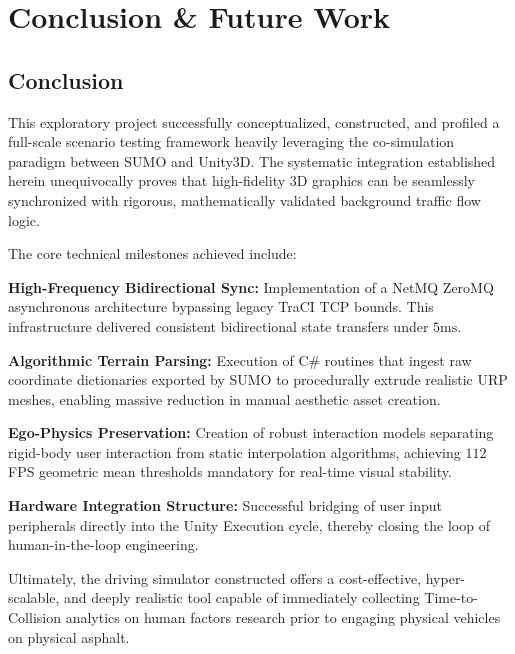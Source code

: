 \chapter{Conclusion \& Future Work}

\section{Conclusion}

This exploratory project successfully conceptualized, constructed, and profiled a full-scale scenario testing framework heavily leveraging the co-simulation paradigm between SUMO and Unity3D. The systematic integration established herein unequivocally proves that high-fidelity 3D graphics can be seamlessly synchronized with rigorous, mathematically validated background traffic flow logic.

The core technical milestones achieved include:
\begin{enumerate}[label={\colorbox{PrimaryNavy}{\makebox[1.2em][c]{\color{white}\bfseries\arabic*}}}, leftmargin=3em, itemsep=8pt]
    \item \textbf{High-Frequency Bidirectional Sync:} Implementation of a NetMQ ZeroMQ asynchronous architecture bypassing legacy TraCI TCP bounds. This infrastructure delivered consistent bidirectional state transfers under $5\text{ms}$.
    \item \textbf{Algorithmic Terrain Parsing:} Execution of C\# routines that ingest raw coordinate dictionaries exported by SUMO to procedurally extrude realistic URP meshes, enabling massive reduction in manual aesthetic asset creation.
    \item \textbf{Ego-Physics Preservation:} Creation of robust interaction models separating rigid-body user interaction from static interpolation algorithms, achieving $112$ FPS geometric mean thresholds mandatory for real-time visual stability.
    \item \textbf{Hardware Integration Structure:} Successful bridging of user input peripherals directly into the Unity Execution cycle, thereby closing the loop of human-in-the-loop engineering.
\end{enumerate}

Ultimately, the driving simulator constructed offers a cost-effective, hyper-scalable, and deeply realistic tool capable of immediately collecting Time-to-Collision analytics on human factors research prior to engaging physical vehicles on physical asphalt.

